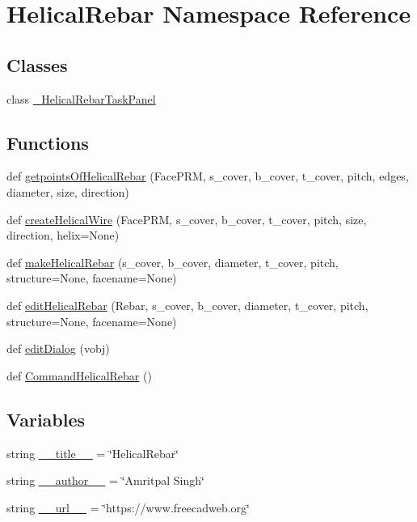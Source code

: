 \hypertarget{namespaceHelicalRebar}{}\section{Helical\+Rebar Namespace Reference}
\label{namespaceHelicalRebar}
\subsection*{Classes}
\begin{DoxyCompactItemize}
\item 
class \hyperlink{classHelicalRebar_1_1__HelicalRebarTaskPanel}{\+\_\+\+Helical\+Rebar\+Task\+Panel}
\end{DoxyCompactItemize}
\subsection*{Functions}
\begin{DoxyCompactItemize}
\item 
def \hyperlink{namespaceHelicalRebar_a4fcf2dabc065c39ce5c8cf6995051352}{getpoints\+Of\+Helical\+Rebar} (Face\+P\+RM, s\+\_\+cover, b\+\_\+cover, t\+\_\+cover, pitch, edges, diameter, size, direction)
\item 
def \hyperlink{namespaceHelicalRebar_a1a2b3ce39b904ab0c3892ed0965d2844}{create\+Helical\+Wire} (Face\+P\+RM, s\+\_\+cover, b\+\_\+cover, t\+\_\+cover, pitch, size, direction, helix=None)
\item 
def \hyperlink{namespaceHelicalRebar_a8a4f12ed70819996ac31877957dfab08}{make\+Helical\+Rebar} (s\+\_\+cover, b\+\_\+cover, diameter, t\+\_\+cover, pitch, structure=None, facename=None)
\item 
def \hyperlink{namespaceHelicalRebar_aea0d3838b1b171f801acf1046d111c8b}{edit\+Helical\+Rebar} (Rebar, s\+\_\+cover, b\+\_\+cover, diameter, t\+\_\+cover, pitch, structure=None, facename=None)
\item 
def \hyperlink{namespaceHelicalRebar_ab9725ab4f1e5650133dba94c24907331}{edit\+Dialog} (vobj)
\item 
def \hyperlink{namespaceHelicalRebar_ad8ff0caf1e8a56ac47ce25062db8bc46}{Command\+Helical\+Rebar} ()
\end{DoxyCompactItemize}
\subsection*{Variables}
\begin{DoxyCompactItemize}
\item 
string \hyperlink{namespaceHelicalRebar_a28c95505364eadd0c2d4abbd80091bef}{\+\_\+\+\_\+title\+\_\+\+\_\+} = \char`\"{}Helical\+Rebar\char`\"{}
\item 
string \hyperlink{namespaceHelicalRebar_a925dcfed2ffef215413157f48d7b6e57}{\+\_\+\+\_\+author\+\_\+\+\_\+} = \char`\"{}Amritpal Singh\char`\"{}
\item 
string \hyperlink{namespaceHelicalRebar_a9c74e4634d00eef07ed630054e69fbff}{\+\_\+\+\_\+url\+\_\+\+\_\+} = \char`\"{}https\+://www.\+freecadweb.\+org\char`\"{}
\end{DoxyCompactItemize}


